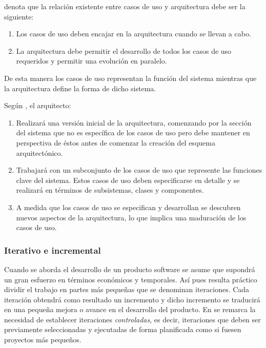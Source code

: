 \cite{rumbaugh_jacobson_pud} denota que la relación existente entre casos de uso
y arquitectura debe ser la siguiente: 

\begin{enumerate}
\item Los casos de uso deben encajar en la arquitectura cuando se llevan a cabo.

\item La arquitectura debe permitir el desarrollo de todos los casos de uso
  requeridos y permitir una evolución en paralelo. 
\end{enumerate}

De esta manera los casos de uso representan la función del sistema mientras que
la arquitectura define la forma de dicho sistema.

Según \cite{rumbaugh_jacobson_pud}, el arquitecto:

\begin{enumerate}

\item Realizará una versión inicial de la arquitectura, comenzando por la sección del
  sistema que no es específica de los casos de uso pero debe mantener en
  perspectiva de éstos antes de comenzar la creación del esquema arquitectónico.

\item Trabajará con un subconjunto de los casos de uso que represente las
  funciones clave del sistema. Estos casos de uso deben especificarse en detalle y
  se realizará en términos de subsistemas, clases y componentes. 

\item A medida que los casos de uso se especifican y desarrollan se
  descubren nuevos aspectos de la arquitectura, lo que implica una maduración de
  los casos de uso. 

\end{enumerate}


\subsubsection{Iterativo e incremental}

Cuando se aborda el desarrollo de un producto software se asume que supondrá un
gran esfuerzo en términos económicos y temporales. Así pues resulta práctico
dividir el trabajo en partes más pequeñas que se denominan iteraciones. Cada
iteración obtendrá como resultado un incremento y dicho incremento se traducirá
en una pequeña mejora o avance en el desarrollo del producto. En
\cite{rumbaugh_jacobson_pud} se remarca la necesidad de establecer iteraciones
\textit{controladas}, es decir, iteraciones que deben ser previamente
seleccionadas y ejecutadas de forma planificada como si fuesen proyectos más
pequeños. 

